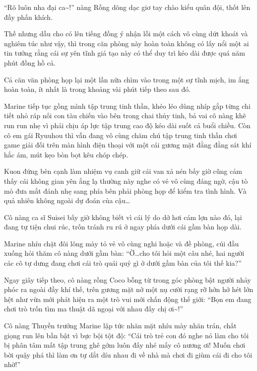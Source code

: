 \documentclass[../main.tex]{subfiles}
\begin{document}
``Rõ luôn nha đại ca\~{}!'' nàng Rồng dõng dạc giơ tay chào kiểu quân đội, thốt lên đầy phấn khích.


Thế nhưng dẫu cho có lên tiếng đồng ý nhận lỗi một cách vô cùng dứt khoát và nghiêm túc như vậy, thì trong căn phòng này hoàn toàn không có lấy nổi một ai tin tưởng rằng cái sự yên tĩnh giả tạo này có thể duy trì kéo dài được quá năm phút đồng hồ cả.

\ct

Cả căn văn phòng họp lại một lần nữa chìm vào trong một sự tĩnh mịch, im ắng hoàn toàn, ít nhất là trong khoảng vài phút tiếp theo sau đó.

Marine tiếp tục gồng mình tập trung tinh thần, khéo léo dùng nhíp gắp từng chi tiết nhỏ ráp nối con tàu chiến vào bên trong chai thủy tinh, bả vai cô nàng khẽ run run nhẹ vì phải chịu áp lực tập trung cao độ kéo dài suốt cả buổi chiều. Còn cô em gái Ryuuhou thì vẫn đang vô cùng chăm chú tập trung tinh thần chơi game giải đối trên màn hình điện thoại với một cái gương mặt đằng đằng sát khí hắc ám, mút kẹo bòn bọt kêu chóp chép.

Kuon đứng bên cạnh làm nhiệm vụ canh giữ cái van xả nén bấy giờ cũng cảm thấy cái không gian yên ắng lạ thường này nghe có vẻ vô cùng đáng ngờ, cậu tò mò đưa mắt đánh nhẹ sang phía bên phải phòng họp để kiểm tra tình hình. Và quả nhiên không ngoài dự đoán của cậu\dots

Cô nàng ca sĩ Suisei bấy giờ không biết vì cái lý do dở hơi cám lợn nào đó, lại đang tự tiện chui rúc, trốn tránh ru rú ở ngay phía dưới cái gầm bàn họp dài.

Marine nhíu chặt đôi lông mày tỏ vẻ vô cùng nghi hoặc và đề phòng, cúi đầu xuống hỏi thăm cô nàng dưới gầm bàn: ``Ờ\dots cho tôi hỏi một câu nhé, hai người các cô tự dưng đang chơi cái trò quái quỷ gì ở dưới gầm bàn của tôi thế kia?''

Ngay giây tiếp theo, cô nàng rồng Coco bỗng từ trong góc phòng bật người nhảy phóc ra ngoài đầy khí thế, trên gương mặt nở một nụ cười rạng rỡ hớn hở hét lớn hệt như vừa mới phát hiện ra một trò vui mới chấn động thế giới: ``Bọn em đang chơi trò trốn tìm ma thuật dã ngoại với nhau đấy chị ơi\~{}!''


Cô nàng Thuyền trưởng Marine lập tức nhăn mặt nhíu mày nhăn trán, chất giọng run lên bần bật vì bực bội tột độ: ``Cái trò trẻ con đó nghe nó làm cho tôi bị phân tâm mất tập trung ghê gớm luôn đấy nhé mấy cô nương ơi! Muốn chơi bời quậy phá thì làm ơn tự dắt díu nhau đi về nhà mà chơi đi giùm cái đi cho tôi nhờ!''
\end{document}

